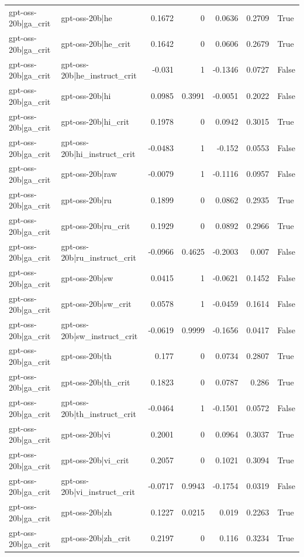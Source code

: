 \begin{table}
\begin{tabular}{l l r r r r l}
gpt-oss-20b|ga_crit & gpt-oss-20b|he & 0.1672 & 0 & 0.0636 & 0.2709 & True \\
gpt-oss-20b|ga_crit & gpt-oss-20b|he_crit & 0.1642 & 0 & 0.0606 & 0.2679 & True \\
gpt-oss-20b|ga_crit & gpt-oss-20b|he_instruct_crit & -0.031 & 1 & -0.1346 & 0.0727 & False \\
gpt-oss-20b|ga_crit & gpt-oss-20b|hi & 0.0985 & 0.3991 & -0.0051 & 0.2022 & False \\
gpt-oss-20b|ga_crit & gpt-oss-20b|hi_crit & 0.1978 & 0 & 0.0942 & 0.3015 & True \\
gpt-oss-20b|ga_crit & gpt-oss-20b|hi_instruct_crit & -0.0483 & 1 & -0.152 & 0.0553 & False \\
gpt-oss-20b|ga_crit & gpt-oss-20b|raw & -0.0079 & 1 & -0.1116 & 0.0957 & False \\
gpt-oss-20b|ga_crit & gpt-oss-20b|ru & 0.1899 & 0 & 0.0862 & 0.2935 & True \\
gpt-oss-20b|ga_crit & gpt-oss-20b|ru_crit & 0.1929 & 0 & 0.0892 & 0.2966 & True \\
gpt-oss-20b|ga_crit & gpt-oss-20b|ru_instruct_crit & -0.0966 & 0.4625 & -0.2003 & 0.007 & False \\
gpt-oss-20b|ga_crit & gpt-oss-20b|sw & 0.0415 & 1 & -0.0621 & 0.1452 & False \\
gpt-oss-20b|ga_crit & gpt-oss-20b|sw_crit & 0.0578 & 1 & -0.0459 & 0.1614 & False \\
gpt-oss-20b|ga_crit & gpt-oss-20b|sw_instruct_crit & -0.0619 & 0.9999 & -0.1656 & 0.0417 & False \\
gpt-oss-20b|ga_crit & gpt-oss-20b|th & 0.177 & 0 & 0.0734 & 0.2807 & True \\
gpt-oss-20b|ga_crit & gpt-oss-20b|th_crit & 0.1823 & 0 & 0.0787 & 0.286 & True \\
gpt-oss-20b|ga_crit & gpt-oss-20b|th_instruct_crit & -0.0464 & 1 & -0.1501 & 0.0572 & False \\
gpt-oss-20b|ga_crit & gpt-oss-20b|vi & 0.2001 & 0 & 0.0964 & 0.3037 & True \\
gpt-oss-20b|ga_crit & gpt-oss-20b|vi_crit & 0.2057 & 0 & 0.1021 & 0.3094 & True \\
gpt-oss-20b|ga_crit & gpt-oss-20b|vi_instruct_crit & -0.0717 & 0.9943 & -0.1754 & 0.0319 & False \\
gpt-oss-20b|ga_crit & gpt-oss-20b|zh & 0.1227 & 0.0215 & 0.019 & 0.2263 & True \\
gpt-oss-20b|ga_crit & gpt-oss-20b|zh_crit & 0.2197 & 0 & 0.116 & 0.3234 & True \\

\end{tabular}
\end{table}
